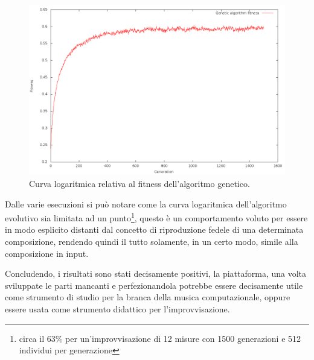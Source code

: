 \begin{figure}[H]
\centering
\caption{Curva logaritmica relativa al fitness dell'algoritmo genetico.}
\includegraphics[width=\textwidth]{img/logcurve.png}
\end{figure}
Dalle varie esecuzioni si può notare come la curva logaritmica dell'algoritmo
evolutivo sia limitata ad un punto\footnote{circa il 63\% per un'improvvisazione
di 12 misure con 1500 generazioni e 512 individui per generazione},
questo è un comportamento voluto
per essere in modo esplicito distanti dal concetto di riproduzione fedele di una
determinata composizione, rendendo quindi il tutto solamente, in un certo modo,
simile alla composizione in input.

Concludendo, i risultati sono stati decisamente positivi, la piattaforma, una volta
sviluppate le parti mancanti e perfezionandola potrebbe essere decisamente utile
come strumento di studio per la branca della musica computazionale, oppure
essere usata come strumento didattico per l'improvvisazione.
